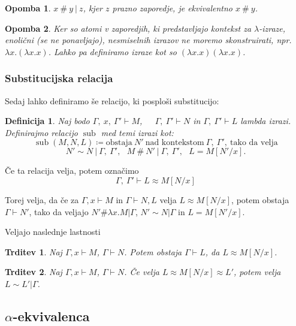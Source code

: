 \documentclass{article}
\DeclareMathOperator{\sub}{sub}
\newtheorem{trditev}{Trditev}
\newtheorem{opomba}{Opomba}
\newtheorem{definicija}{Definicija}
\begin{document}
\begin{opomba}
    \(x \ \#\  y \ \vert\  z\), kjer \(z\) prazno zaporedje, je ekvivalentno \(x \ \#\  y\).
\end{opomba}

\begin{opomba}
    Ker so atomi v zaporedjih, ki predstavljajo kontekst za \(\lambda\)-izraze, enolični (se ne ponavljajo), nesmiselnih izrazov ne moremo skonstruirati, npr. \(\lambda x.(\lambda x.x)\). Lahko pa definiramo izraze kot so \((\lambda x.x)(\lambda x.x)\).
\end{opomba}

\subsubsection{Substitucijska relacija}

Sedaj lahko definiramo še relacijo, ki posploši substitucijo:

\begin{definicija}
    Naj bodo \(\Gamma,\ x,\ \Gamma' \vdash M\),\ \ \ \(\Gamma,\ \Gamma' \vdash N\) in \(\Gamma,\ \Gamma' \vdash L\) lambda izrazi.
    Definirajmo relacijo \(\sub\) med temi izrazi kot:
    \[\sub(M, N, L) \coloneq \text{obstaja}\ N'\ \text{nad kontekstom}\ \Gamma,\ \Gamma',\ \text{tako da velja}
    \]
    \[N' \sim N \ \vert\ \Gamma,\ \Gamma',\ \ \ M \ \#\ N' \ \vert \ \Gamma,\ \Gamma',\ \ \ L = M[N'/x].\]
\end{definicija}
Če ta relacija velja, potem označimo
\[
    \Gamma,\ \Gamma' \vdash L \approx M[N/x]
\]

Torej velja, da če za \(\Gamma, x \vdash M\) in \(\Gamma \vdash N, L\) velja \(L \approx M[N/x]\), potem obstaja \(\Gamma \vdash N'\), tako da veljajo \(N' \# \lambda x. M | \Gamma\), \(N' \sim N | \Gamma\) in \(L = M[N'/x]\).

Veljajo naslednje lastnosti

\begin{trditev}
    Naj \(\Gamma, x \vdash M\), \(\Gamma \vdash N\). Potem obstaja \(\Gamma \vdash L\), da \(L \approx M[N/x]\).
\end{trditev}

\begin{trditev}
    Naj \(\Gamma, x \vdash M\), \(\Gamma \vdash N\). Če velja \(L \approx M[N/x] \approx L'\), potem velja \(L \sim L' | \Gamma\).
\end{trditev}

\subsection{\(\alpha\)-ekvivalenca}
\end{document}
